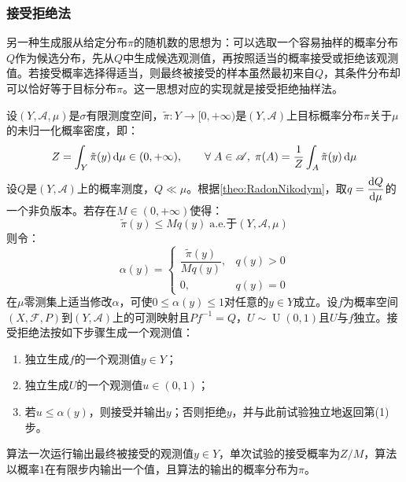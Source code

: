 \subsubsection{接受拒绝法}
另一种生成服从给定分布$\pi$的随机数的思想为：可以选取一个容易抽样的概率分布$Q$作为候选分布，先从$Q$中生成候选观测值，再按照适当的概率接受或拒绝该观测值。若接受概率选择得适当，则最终被接受的样本虽然最初来自$Q$，其条件分布却可以恰好等于目标分布$\pi$。这一思想对应的实现就是接受拒绝抽样法。
\begin{method}
	设$(Y,\mathscr{A},\mu)$是$\sigma$有限测度空间，$\tilde{\pi}:Y\to[0,+\infty)$是$(Y,\mathscr{A})$上目标概率分布$\pi$关于$\mu$的未归一化概率密度，即：
	\begin{equation*}
		Z=\int_{Y}\tilde{\pi}(y)\mathop{}\!\mathrm{d}\mu\in(0,+\infty),\qquad\forall\;A\in\mathscr{A},\;\pi(A)=\frac{1}{Z}\int_{A}\tilde{\pi}(y)\mathop{}\!\mathrm{d}\mu
	\end{equation*}
	设$Q$是$(Y,\mathscr{A})$上的概率测度，$Q\ll\mu$。根据\cref{theo:RadonNikodym}，取$q=\dfrac{\mathop{}\!\mathrm{d} Q}{\mathop{}\!\mathrm{d}\mu}$的一个非负版本。若存在$M\in(0,+\infty)$使得：
	\begin{equation*}
		\tilde{\pi}(y)\leqslant Mq(y)\;\text{a.e.于}(Y,\mathscr{A},\mu)
	\end{equation*}
	则令：
	\begin{equation*}
		\alpha(y)=
		\begin{cases}
			\dfrac{\tilde{\pi}(y)}{Mq(y)},&q(y)>0 \\
			0,&q(y)=0
		\end{cases}
	\end{equation*}
	在$\mu$零测集上适当修改$\alpha$，可使$0\leqslant\alpha(y)\leqslant1$对任意的$y\in Y$成立。设$f$为概率空间$(X,\mathscr{F},P)$到$(Y,\mathscr{A})$上的可测映射且$Pf^{-1}=Q$，$U\sim\operatorname{U}(0,1)$且$U$与$f$独立。接受拒绝法按如下步骤生成一个观测值：
	\begin{enumerate}
		\item 独立生成$f$的一个观测值$y\in Y$；
		\item 独立生成$U$的一个观测值$u\in(0,1)$；
		\item 若$u\leqslant\alpha(y)$，则接受并输出$y$；否则拒绝$y$，并与此前试验独立地返回第(1)步。
	\end{enumerate}
	算法一次运行输出最终被接受的观测值$y\in Y$，单次试验的接受概率为$Z/M$，算法以概率$1$在有限步内输出一个值，且算法的输出的概率分布为$\pi$。
\end{method}
